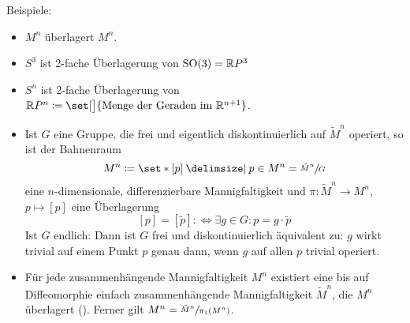 Beispiele:
\begin{itemize}
    \item $M^n$ überlagert $M^n$.
    \item $S^3$ ist 2-fache Überlagerung von $\operatorname{SO}(3) = \mathbb{R}P^3$
    \item $S^n$ ist 2-fache Überlagerung von $\mathbb{R}P^n \coloneqq \set[\big]{\text{Menge der Geraden im }\mathbb{R}^{n+1}}$.
    \item Ist $G$ eine Gruppe, die frei und eigentlich diskontinuierlich auf $\tilde{M}^n$ operiert, so ist der Bahnenraum 
    \[
        M^n \coloneqq \set*{[p] \given p \in M^n} = \sfrac{\tilde{M}^n}{G}
    \]
    eine $n$-dimensionale, differenzierbare Mannigfaltigkeit und $\pi \colon \tilde{M}^n \to M^n$, $p \mapsto [p]$ eine Überlagerung
    \[
        [p] = [\tilde{p}] :\Longleftrightarrow \exists g \in G : p = g \cdot \tilde{p}
    \]
    Ist $G$ endlich: Dann ist $G$ frei und diskontinuierlich äquivalent zu: $g$ wirkt trivial auf einem Punkt $p$ genau dann, wenn $g$ auf allen $p$ trivial operiert.
    \item Für jede zusammenhängende Mannigfaltigkeit $M^n$ existiert eine bis auf Diffeomorphie einfach zusammenhängende Mannigfaltigkeit $\tilde{M}^n$, die $M^n$ überlagert ().
    Ferner gilt $M^n = \sfrac{\tilde{M}^n}{\pi_1(M^n)}$.
\end{itemize}

